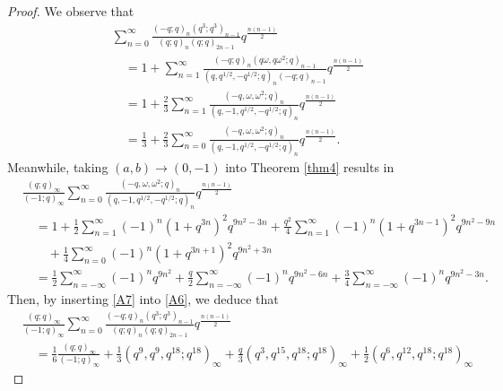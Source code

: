 \documentclass[10pt,a4paper]{amsart}
\begin{document}
\begin{proof}
We observe that
\begin{align}
&\sum_{n=0}^{\infty}\frac{\left(-q;q\right)_n\left(q^3;q^3\right)_{n-1}
}
{\left(q;q\right)_{n}\left(q;q\right)_{2n-1}}q^{\frac{n(n-1)}{2}}\nonumber\\
&\quad=1+\sum_{n=1}^{\infty}\frac{\left(-q;q\right)_n
\left(q\omega,q\omega^2;q\right)_{n-1}}
{\left(q,q^{1/2},-q^{1/2};q\right)_n\left(-q;q\right)_{n-1}}
q^{\frac{n\left(n-1\right)}{2}}\nonumber\\
&\quad=1+\frac{2}{3}\sum_{n=1}^{\infty}\frac{\left(-q,\omega,\omega^2;q\right)_{n}}
{\left(q,-1,q^{1/2},-q^{1/2};q\right)_n}
q^{\frac{n\left(n-1\right)}{2}}\nonumber\\
&\quad=\frac{1}{3}+\frac{2}{3}\sum_{n=0}^{\infty}\frac{\left(-q,\omega,\omega^2;q\right)_{n}}
{\left(q,-1,q^{1/2},-q^{1/2};q\right)_n}
q^{\frac{n\left(n-1\right)}{2}}.\label{A6}
\end{align}
Meanwhile, taking $\left(a,b\right)\to\left(0,-1\right)$ into Theorem \ref{thm4} results in
\begin{align}
&\frac{\left(q;q\right)_{\infty}}{\left(-1;q\right)_{\infty}}
\sum_{n=0}^{\infty}\frac{\left(-q,\omega,\omega^2;q\right)_n}
{\left(q,-1,q^{1/2},-q^{1/2};q\right)_n}q^{\frac{n\left(n-1\right)}{2}}\nonumber\\
&\quad=1+\frac{1}{2}\sum_{n=1}^{\infty}\left(-1\right)^n\left(1+q^{3n}\right)^2
q^{9n^2-3n}
+\frac{q^2}{4}\sum_{n=1}^{\infty}\left(-1\right)^n\left(1+q^{3n-1}\right)^2
q^{9n^2-9n}\nonumber\\
&\qquad+\frac{1}{4}\sum_{n=0}^{\infty}\left(-1\right)^n\left(1+q^{3n+1}\right)^2
q^{9n^2+3n}\nonumber\\
&\quad=\frac{1}{2}\sum_{n=-\infty}^{\infty}\left(-1\right)^nq^{9n^2}
+\frac{q}{2}\sum_{n=-\infty}^{\infty}\left(-1\right)^nq^{9n^2-6n}
+\frac{3}{4}\sum_{n=-\infty}^{\infty}\left(-1\right)^nq^{9n^2-3n}.\label{A7}
\end{align}
Then, by inserting \eqref{A7} into \eqref{A6}, we deduce that
\begin{align}
&\frac{\left(q;q\right)_{\infty}}{\left(-1;q\right)_{\infty}}
\sum_{n=0}^{\infty}\frac{\left(-q;q\right)_n\left(q^3;q^3\right)_{n-1}
}
{\left(q;q\right)_{n}\left(q;q\right)_{2n-1}}q^{\frac{n(n-1)}{2}}\nonumber\\
&\quad=\frac{1}{6}\frac{\left(q;q\right)_{\infty}}{\left(-1;q\right)_{\infty}}
+\frac{1}{3}\left(q^9,q^9,q^{18};q^{18}\right)_{\infty}
+\frac{q}{3}\left(q^3,q^{15},q^{18};q^{18}\right)_{\infty}
+\frac{1}{2}\left(q^6,q^{12},q^{18};q^{18}\right)_{\infty}

\end{align}
\end{proof}
\end{document}
